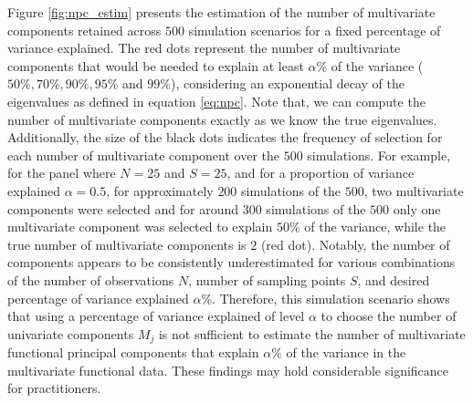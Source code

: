 Figure \ref{fig:npc_estim} presents the estimation of the number of multivariate components retained across $500$ simulation scenarios for a fixed percentage of variance explained. The red dots represent the number of multivariate components that would be needed to explain at least $\alpha\%$ of the variance ($50\%, 70\%, 90\%, 95\%$ and $99\%$), considering an exponential decay of the eigenvalues as defined in equation \eqref{eq:npc}. Note that, we can compute the number of multivariate components exactly as we know the true eigenvalues. Additionally, the size of the black dots indicates the frequency of selection for each number of multivariate component over the $500$ simulations. For example, for the panel where $N = 25$ and $S = 25$, and for a proportion of variance explained $\alpha = 0.5$, for approximately $200$ simulations of the $500$, two multivariate components were selected and for around $300$ simulations of the $500$ only one multivariate component was selected to explain $50\%$ of the variance, while the true number of multivariate components is $2$ (red dot). Notably, the number of components appears to be consistently underestimated for various combinations of the number of observations $N$, number of sampling points $S$, and desired percentage of variance explained $\alpha\%$. Therefore, this simulation scenario shows that using a percentage of variance explained of level $\alpha$ to choose the number of univariate components $M_j$ is not sufficient to estimate the number of multivariate functional principal components that explain $\alpha\%$ of the variance in the multivariate functional data. These findings may hold considerable significance for practitioners.

